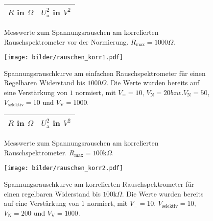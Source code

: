 		
	\begin{figure}[htbp]

	\begin{minipage}{0.3\textwidth} 

			\centering
			\begin{tabular}{cc}
				\toprule \midrule
				$R$ in $\Omega$ & $U_\text{a}^2$ in $V^2$ \\
				\midrule
							
				\midrule \bottomrule
			\end{tabular}
			\caption{Messwerte zum Spannungsrauschen am korrelierten 
			Rauschspektrometer vor der Normierung. $R_\text{max}=1000 \Omega$.}
			\label{tab:rauschen_korr1}

	\end{minipage}
	
	\hfill
	
	\begin{minipage}{0.6\textwidth}

			\centering
			\texttt{[image: bilder/rauschen\_korr1.pdf]}
			\caption{Spannungsrauschkurve am einfachen Rauschspektrometer für einen 
			Regelbaren Widerstand bis $1000\Omega$. Die Werte wurden bereits auf eine Verstärkung von 
			$1$ normiert, mit $V_= =10$, $V_\text{N}=20 bzw. V_\text{N}=50$, 
			$V_\text{selektiv}=10$ und $V_\text{V}=1000$. }
			\label{fig:rauschen_korr1}
			
	\end{minipage}

	\end{figure}		
	
	
	
	
		\begin{figure}[htbp]

	\begin{minipage}{0.3\textwidth} 

			\centering
			\begin{tabular}{cc}
				\toprule \midrule
				$R$ in $\Omega$ & $U_\text{a}^2$ in $V^2$ \\
				\midrule
							
				\midrule \bottomrule
			\end{tabular}
			\caption{Messwerte zum Spannungsrauschen am korrelierten  
			Rauschspektrometer. $R_\text{max}=100 \text{k}\Omega$.}
			\label{tab:rauschen_korr2}

	\end{minipage}

	\hfill

	\begin{minipage}{0.6\textwidth}

			\centering
			\texttt{[image: bilder/rauschen\_korr2.pdf]}
			\caption{Spannungsrauschkurve am korrelierten Rauschspektrometer für einen 
			regelbaren Widerstand bis $100\text{k}\Omega$. Die Werte wurden bereits auf eine 
			Verstärkung von 	$1$ normiert, mit $V_= =10$, $V_\text{selektiv}=10$, $V_\text{N}=200$ und 
			$V_\text{V}=1000$. }
			\label{fig:rauschen_korr2}
			
	\end{minipage}

	\end{figure}		
		

